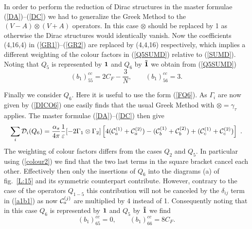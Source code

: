 \documentclass[12pt]{article}
\def\as{\alpha_s}
\newcommand{\be}{\begin{equation}}
\newcommand{\ee}{\end{equation}}
\begin{document}
\begin{itemize}
\begin{itemize}
In order to perform the reduction of Dirac structures in the
master formulae (\ref{DA})--(\ref{DC}) we had to generalize the Greek
Method to the $(V-A)\otimes(V+A)$ operators. In this case $\otimes$
should be replaced by 1 as otherwise the Dirac structures would
identically vanish. Now the coefficients (4,16,4) in 
(\ref{GR1})--(\ref{GR2}) are
replaced by (4,4,16) respectively, which implies a different
weighting of the colour factors in (\ref{Q5SUMD}) 
relative to (\ref{SUMD}). Noting
that $Q_5$ is represented by ${\bf 1}$ and $Q_6$ by ${\bf \tilde 1}$
we obtain from (\ref{Q5SUMD})
\be\label{Q5CROW}
(b_1)_{55}^{cc}=2 C_F-\frac{3}{N},\quad\quad
(b_1)_{56}^{cc}=3.
\ee

Finally we consider $Q_6$. Here it is useful to use the form
(\ref{FQ6}). As $\Gamma_i$ are now given by (\ref{DICO6}) one 
easily finds that the usual Greek Method with $\otimes=\gamma_\tau$
applies. The master formulae (\ref{DA})--(\ref{DC}) then give
\be\label{Q6SUMD}
\sum_i {\cal D}_i(Q_6)=\frac{\as}{4\pi} \frac{1}{\varepsilon}
[-2\Gamma_1\otimes\Gamma_2]
\left[4({\cal C}_a^{(1)}+{\cal C}_a^{(2)})-
 ({\cal C}_b^{(1)}+{\cal C}_b^{(2)})+
({\cal C}_c^{(1)}+{\cal C}_c^{(2)})\right]~.
\ee
The weighting of colour factors differs from the cases $Q_2$ and $Q_5$.
In particular using (\ref{colour2}) we find that the two 
last terms in the square
bracket cancel each other. Effectively then only the insertions of
$Q_6$ into the diagrams (a) of fig.~\ref{L:15}
and its symmetric counterpart contribute. However, contrary to
the case of the operators $Q_{1-5}$ this contribution will not be canceled
by the $\delta_{ij}$ term in (\ref{a1b1}) as now ${\cal C}_a^{(j)}$ 
are multiplied
by 4 instead of 1. Consequently noting that in this case
$Q_6$ is represented by ${\bf 1}$ and $Q_5$ by ${\bf \tilde 1}$
we find
\be\label{Q6CROW}
(b_1)_{65}^{cc}=0,\quad\quad
(b_1)_{66}^{cc}=8 C_F. 
\ee


\end{itemize}
\end{itemize}
\end{document}
